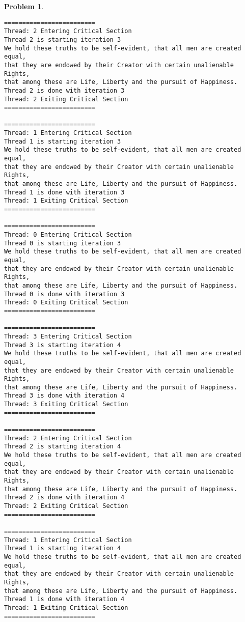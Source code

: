 \documentclass{article}
\theoremstyle{problemstyle}
\newtheorem{problem}{Problem}
\begin{document}
\begin{problem}
\begin{enumerate}[label=(\alph*)]
\begin{lstlisting}
=========================
Thread: 2 Entering Critical Section
Thread 2 is starting iteration 3
We hold these truths to be self-evident, that all men are created equal,
that they are endowed by their Creator with certain unalienable Rights,
that among these are Life, Liberty and the pursuit of Happiness.
Thread 2 is done with iteration 3
Thread: 2 Exiting Critical Section
=========================

=========================
Thread: 1 Entering Critical Section
Thread 1 is starting iteration 3
We hold these truths to be self-evident, that all men are created equal,
that they are endowed by their Creator with certain unalienable Rights,
that among these are Life, Liberty and the pursuit of Happiness.
Thread 1 is done with iteration 3
Thread: 1 Exiting Critical Section
=========================

=========================
Thread: 0 Entering Critical Section
Thread 0 is starting iteration 3
We hold these truths to be self-evident, that all men are created equal,
that they are endowed by their Creator with certain unalienable Rights,
that among these are Life, Liberty and the pursuit of Happiness.
Thread 0 is done with iteration 3
Thread: 0 Exiting Critical Section
=========================

=========================
Thread: 3 Entering Critical Section
Thread 3 is starting iteration 4
We hold these truths to be self-evident, that all men are created equal,
that they are endowed by their Creator with certain unalienable Rights,
that among these are Life, Liberty and the pursuit of Happiness.
Thread 3 is done with iteration 4
Thread: 3 Exiting Critical Section
=========================

=========================
Thread: 2 Entering Critical Section
Thread 2 is starting iteration 4
We hold these truths to be self-evident, that all men are created equal,
that they are endowed by their Creator with certain unalienable Rights,
that among these are Life, Liberty and the pursuit of Happiness.
Thread 2 is done with iteration 4
Thread: 2 Exiting Critical Section
=========================

=========================
Thread: 1 Entering Critical Section
Thread 1 is starting iteration 4
We hold these truths to be self-evident, that all men are created equal,
that they are endowed by their Creator with certain unalienable Rights,
that among these are Life, Liberty and the pursuit of Happiness.
Thread 1 is done with iteration 4
Thread: 1 Exiting Critical Section
=========================


\end{lstlisting}
\end{enumerate}
\end{problem}
\end{document}
